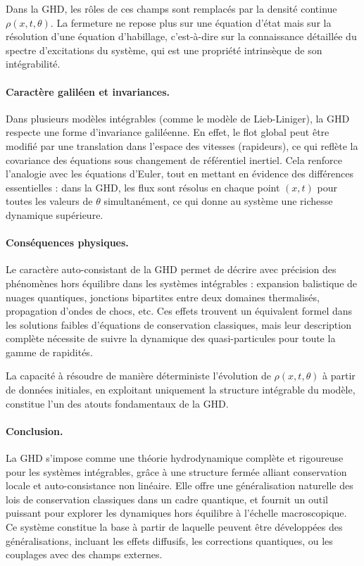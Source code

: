 Dans la GHD, les rôles de ces champs sont remplacés par la densité continue $\rho(x,t,\theta)$. La fermeture ne repose plus sur une équation d’état mais sur la résolution d’une équation d’habillage, c’est-à-dire sur la connaissance détaillée du spectre d’excitations du système, qui est une propriété intrinsèque de son intégrabilité.

\paragraph{Caractère galiléen et invariances.}
Dans plusieurs modèles intégrables (comme le modèle de Lieb-Liniger), la GHD respecte une forme d’invariance galiléenne. En effet, le flot global peut être modifié par une translation dans l’espace des vitesses (rapideurs), ce qui reflète la covariance des équations sous changement de référentiel inertiel. Cela renforce l’analogie avec les équations d’Euler, tout en mettant en évidence des différences essentielles : dans la GHD, les flux sont résolus en chaque point $(x,t)$ pour toutes les valeurs de $\theta$ simultanément, ce qui donne au système une richesse dynamique supérieure.

\paragraph{Conséquences physiques.}
Le caractère auto-consistant de la GHD permet de décrire avec précision des phénomènes hors équilibre dans les systèmes intégrables : expansion balistique de nuages quantiques, jonctions bipartites entre deux domaines thermalisés, propagation d’ondes de chocs, etc. Ces effets trouvent un équivalent formel dans les solutions faibles d’équations de conservation classiques, mais leur description complète nécessite de suivre la dynamique des quasi-particules pour toute la gamme de rapidités.

La capacité à résoudre de manière déterministe l’évolution de $\rho(x,t,\theta)$ à partir de données initiales, en exploitant uniquement la structure intégrable du modèle, constitue l’un des atouts fondamentaux de la GHD.

\paragraph{Conclusion.}
La GHD s’impose comme une théorie hydrodynamique complète et rigoureuse pour les systèmes intégrables, grâce à une structure fermée alliant conservation locale et auto-consistance non linéaire. Elle offre une généralisation naturelle des lois de conservation classiques dans un cadre quantique, et fournit un outil puissant pour explorer les dynamiques hors équilibre à l’échelle macroscopique. Ce système constitue la base à partir de laquelle peuvent être développées des généralisations, incluant les effets diffusifs, les corrections quantiques, ou les couplages avec des champs externes.


